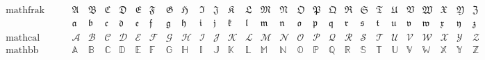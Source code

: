 \begin{align*}
\begin{array}{l|cccccccccccccccccccccccccc}
  \text{mathfrak}\qquad &
  \mathfrak{A} & \mathfrak{B} & \mathfrak{C} & \mathfrak{D} & \mathfrak{E} & \mathfrak{F} & \mathfrak{G} & \mathfrak{H} & \mathfrak{I} & \mathfrak{J} & \mathfrak{K} & \mathfrak{L} & \mathfrak{M} & \mathfrak{N} & \mathfrak{O} & \mathfrak{P} & \mathfrak{Q} & \mathfrak{R} & \mathfrak{S} & \mathfrak{T} & \mathfrak{U} & \mathfrak{V} & \mathfrak{W} & \mathfrak{X} & \mathfrak{Y} & \mathfrak{Z} \\
  \text{} &
  \mathfrak{a} & \mathfrak{b} & \mathfrak{c} & \mathfrak{d} & \mathfrak{e} & \mathfrak{f} & \mathfrak{g} & \mathfrak{h} & \mathfrak{i} & \mathfrak{j} & \mathfrak{k} & \mathfrak{l} & \mathfrak{m} & \mathfrak{n} & \mathfrak{o} & \mathfrak{p} & \mathfrak{q} & \mathfrak{r} & \mathfrak{s} & \mathfrak{t} & \mathfrak{u} & \mathfrak{v} & \mathfrak{w} & \mathfrak{x} & \mathfrak{y} & \mathfrak{z} \\[2ex]
  \text{mathcal} &
  \mathcal{A} & \mathcal{B} & \mathcal{C} & \mathcal{D} & \mathcal{E} & \mathcal{F} & \mathcal{G} & \mathcal{H} & \mathcal{I} & \mathcal{J} & \mathcal{K} & \mathcal{L} & \mathcal{M} & \mathcal{N} & \mathcal{O} & \mathcal{P} & \mathcal{Q} & \mathcal{R} & \mathcal{S} & \mathcal{T} & \mathcal{U} & \mathcal{V} & \mathcal{W} & \mathcal{X} & \mathcal{Y} & \mathcal{Z} \\[2ex]
  \text{mathbb}\qquad &
  \mathbb{A} & \mathbb{B} & \mathbb{C} & \mathbb{D} & \mathbb{E} & \mathbb{F} & \mathbb{G} & \mathbb{H} & \mathbb{I} & \mathbb{J} & \mathbb{K} & \mathbb{L} & \mathbb{M} & \mathbb{N} & \mathbb{O} & \mathbb{P} & \mathbb{Q} & \mathbb{R} & \mathbb{S} & \mathbb{T} & \mathbb{U} & \mathbb{V} & \mathbb{W} & \mathbb{X} & \mathbb{Y} & \mathbb{Z}
 \end{array}
\end{align*}
